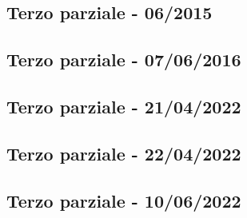 \documentclass[a4paper]{article}
\begin{document}
	\subsection{Terzo parziale - 06/2015}
	
	\subsection{Terzo parziale - 07/06/2016}
	
	\subsection{Terzo parziale - 21/04/2022}
	
	\subsection{Terzo parziale - 22/04/2022}
	
	\subsection{Terzo parziale - 10/06/2022}
\end{document}
